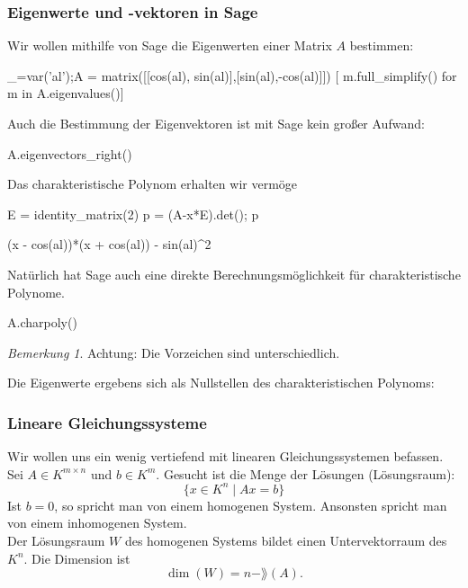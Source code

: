 \documentclass[fontsize=12pt,paper=a4,twoside,bibtotoc,idxtotoc,
liststotoc,pagesize,BCOR1.2cm,DIV15,chapterprefix,pagesize=pdftex]{scrbook}
\theoremstyle{plain}
\theoremstyle{definition}
\theoremstyle{remark}
\newtheorem{bem}[equation]{Bemerkung}
\begin{document}
\subsubsection{Eigenwerte und -vektoren in Sage}
Wir wollen mithilfe von Sage die Eigenwerten einer Matrix $A$ bestimmen:
\begin{sagein}
_=var('al');A = matrix([[cos(al), sin(al)],[sin(al),-cos(al)]])
[ m.full_simplify() for m in  A.eigenvalues()]
\end{sagein}
\begin{sage}
  [-1, 1]
\end{sage}
Auch die Bestimmung der Eigenvektoren ist mit Sage kein großer Aufwand:
\begin{sagein}
A.eigenvectors_right()
\end{sagein}
Das charakteristische Polynom erhalten wir vermöge
\begin{sagein}
E = identity_matrix(2)
p = (A-x*E).det(); p
\end{sagein}
\begin{sage}
(x - cos(al))*(x + cos(al)) - sin(al)^2
\end{sage}
Natürlich hat Sage auch eine direkte Berechnungsmöglichkeit für charakteristische Polynome.
\begin{sagein}
A.charpoly() 
\end{sagein}
\begin{bem}
 Achtung: Die Vorzeichen sind unterschiedlich.
\end{bem}
Die Eigenwerte ergebens sich als Nullstellen des charakteristischen Polynoms:
\begin{sagein}
[m.full_simplify() for m in solve(p==0,x)]
\end{sagein}
\begin{sage}
  [x == -1, x == 1]
\end{sage}
\subsubsection{Lineare Gleichungssysteme}
Wir wollen uns ein wenig vertiefend mit linearen Gleichungssystemen befassen.
Sei $A\in K^{m \times n}$ und $b \in K^m$. Gesucht ist die Menge der
Lösungen (Lösungsraum): 
\[ \{ x \in K^n \;|\; A x = b\} \]
Ist $b=0$, so spricht man von einem homogenen System. Ansonsten spricht man von einem inhomogenen System.\\
Der Lösungsraum $W$ des homogenen Systems bildet einen
Untervektorraum des $K^n$. Die Dimension ist 
\[ \dim (W)=n - \rang(A). \] 
\end{document}
